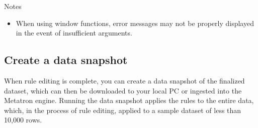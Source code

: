 \documentclass[letterpaper,10pt,english]{sphinxmanual}
\begin{document}
Notes
\begin{itemize}
\item {} 
When using window functions, error messages may not be properly displayed in the event of insufficient arguments.

\end{itemize}


\subsection{Create a data snapshot}
\label{\detokenize{discovery/part07/create_a_datasnapshot:id1}}\label{\detokenize{discovery/part07/create_a_datasnapshot::doc}}
When rule editing is complete, you can create a data snapshot of the finalized dataset, which can then be downloaded to your local PC or ingested into the Metatron engine. Running the data snapshot applies the rules to the entire data, which, in the process of rule editing, applied to a sample dataset of less than 10,000 rows.
\end{document}
